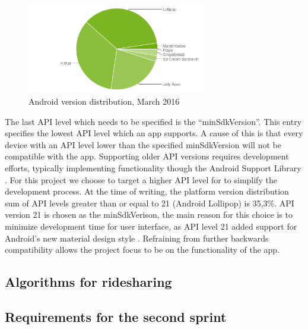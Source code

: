 \begin{figure}[h!]
	\centering
	\includegraphics[width=0.7\textwidth]{figures/android-chart-march.png}
	\caption{Android version distribution, March 2016 \cite{androidDashboard}}
	\label{fig:dashboard}
\end{figure}

The last API level which needs to be specified is the ``minSdkVersion''.
This entry specifies the lowest API level which an app supports.
A cause of this is that every device with an API level lower than the specified minSdkVersion will not be compatible with the app.
Supporting older API versions requires development efforts, typically implementing functionality though the Android Support Library \cite{androidSL}.
For this project we choose to target a higher API level for to simplify the development process.
At the time of writing, the platform version distribution sum of API levels greater than or equal to 21 (Android Lollipop) is 35,3\%.
API version 21 is chosen as the minSdkVerison, the main reason for this choice is to minimize development time for user interface, as API level 21 added support for Android's new material design style \cite{android5API}. Refraining from further backwards compatibility allows the project focus to be on the functionality of the app. 



\subsection{Algorithms for ridesharing}




\subsection{Requirements for the second sprint}
